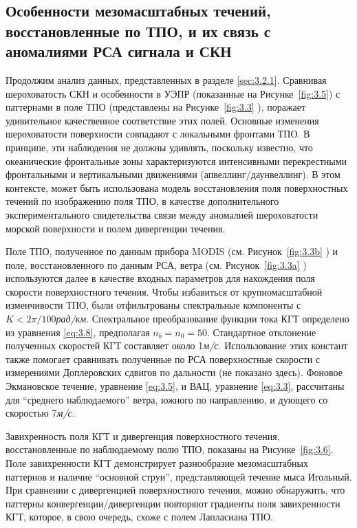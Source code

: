 \subsection{Особенности мезомасштабных течений, восстановленные по ТПО, и их связь с аномалиями РСА сигнала и СКН} \label{sec:3.2.3}
 

Продолжим анализ данных, представленных в разделе \ref{sec:3.2.1}. Сравнивая шероховатость СКН и особенности в УЭПР (показанные на Рисунке~\ref{fig:3.5}) с паттернами в поле ТПО (представлены на Рисунке~\ref{fig:3.3} ), поражает удивительное качественное соответствие этих полей. Основные изменения шероховатости поверхности совпадают с локальными фронтами ТПО. В принципе, эти наблюдения не должны удивлять, поскольку известно, что океанические фронтальные зоны характеризуются интенсивными перекрестными фронтальными и вертикальными движениями (апвеллинг/даунвеллинг). В этом контексте, может быть использована модель восстановления поля поверхностных течений по изображению поля ТПО, в качестве дополнительного экспериментального свидетельства связи между аномалией шероховатости морской поверхности и полем дивергенции течения.

Поле ТПО, полученное по данным прибора MODIS (см. Рисунок~\ref{fig:3.3b} ) и поле, восстановленного по данным РСА, ветра (см. Рисунок~\ref{fig:3.3a} ) используются далее в качестве входных параметров для нахождения поля скорости поверхностного течения. Чтобы избавиться от крупномасштабной изменчивости ТПО, были отфильтрованы спектральные компоненты с $K<2\pi /100$\textit{рад/км}. Спектральное преобразование функции тока КГТ определено из уравнения \eqref{eq:3.8}, предполагая $n_{b} =n_{0} =50$. Стандартное отклонение полученных скоростей КГТ составляет около 1\textit{м/с}. Использование этих констант также помогает сравнивать полученные по РСА поверхностные скорости \citep{Chapron2005, Johannessen2008} с измерениями Доплеровских сдвигов по дальности (не показано здесь). Фоновое Экмановское течение, уравнение \eqref{eq:3.5}, и ВАЦ, уравнение \eqref{eq:3.3}, рассчитаны для ``среднего наблюдаемого'' ветра, южного по направлению, и дующего со скоростью 7\textit{м/с}.

Завихренность поля КГТ и дивергенция поверхностного течения, восстановленные по наблюдаемому полю ТПО, показаны на Рисунке~\ref{fig:3.6}. Поле завихренности КГТ демонстрирует разнообразие мезомасштабных паттернов и наличие ``основной струи'', представляющей течение мыса Игольный. При сравнении с дивергенцией поверхностного течения, можно обнаружить, что паттерны конвергенции/дивергенции повторяют градиенты поля завихренности КГТ, которое, в свою очередь, схоже с полем Лапласиана ТПО.




